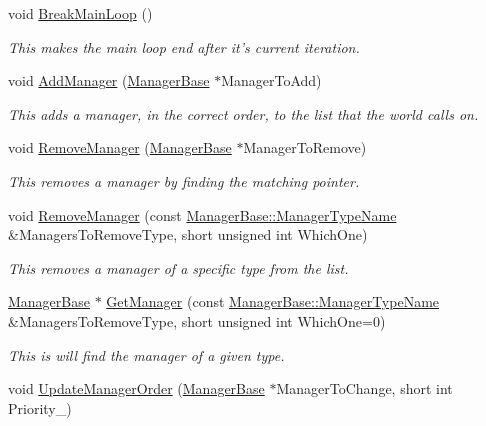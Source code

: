 \begin{DoxyCompactItemize}
void \hyperlink{classphys_1_1World_a126dde1a91def5521a1ebc7aafeeaebd}{BreakMainLoop} ()
\begin{DoxyCompactList}\small\item\em This makes the main loop end after it's current iteration. \item\end{DoxyCompactList}\item 
void \hyperlink{classphys_1_1World_aa709932e21d9d19a91ee38cd7a575556}{AddManager} (\hyperlink{classphys_1_1ManagerBase}{ManagerBase} $\ast$ManagerToAdd)
\begin{DoxyCompactList}\small\item\em This adds a manager, in the correct order, to the list that the world calls on. \item\end{DoxyCompactList}\item 
void \hyperlink{classphys_1_1World_ae3be85997185935421bf5230651d8e37}{RemoveManager} (\hyperlink{classphys_1_1ManagerBase}{ManagerBase} $\ast$ManagerToRemove)
\begin{DoxyCompactList}\small\item\em This removes a manager by finding the matching pointer. \item\end{DoxyCompactList}\item 
void \hyperlink{classphys_1_1World_ad885d1102ecdd13cc277ee3f7dfcb742}{RemoveManager} (const \hyperlink{classphys_1_1ManagerBase_aaa6ccddf23892eaccb898529414f80a5}{ManagerBase::ManagerTypeName} \&ManagersToRemoveType, short unsigned int WhichOne)
\begin{DoxyCompactList}\small\item\em This removes a manager of a specific type from the list. \item\end{DoxyCompactList}\item 
\hyperlink{classphys_1_1ManagerBase}{ManagerBase} $\ast$ \hyperlink{classphys_1_1World_a910befc904c0d0e73b913dedd08e9d98}{GetManager} (const \hyperlink{classphys_1_1ManagerBase_aaa6ccddf23892eaccb898529414f80a5}{ManagerBase::ManagerTypeName} \&ManagersToRemoveType, short unsigned int WhichOne=0)
\begin{DoxyCompactList}\small\item\em This is will find the manager of a given type. \item\end{DoxyCompactList}\item 
void \hyperlink{classphys_1_1World_abbe8ceecc6bdbd542a250fd721c05276}{UpdateManagerOrder} (\hyperlink{classphys_1_1ManagerBase}{ManagerBase} $\ast$ManagerToChange, short int Priority\_\-)

\end{DoxyCompactItemize}
